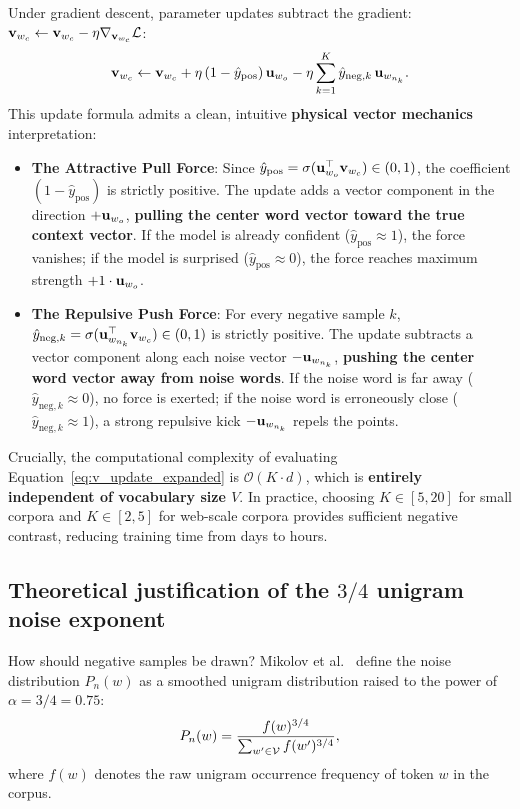 \documentclass[../../main.tex]{subfiles}
\begin{document}
Under gradient descent, parameter updates subtract the gradient: $\mathbf{v}_{w_c} \leftarrow \mathbf{v}_{w_c} - \eta \nabla_{\mathbf{v}_{w_c}} \mathcal{L}$:
\begin{equation}
\label{eq:v_update_expanded}
\mathbf{v}_{w_c} \leftarrow \mathbf{v}_{w_c} + \eta \left( 1 - \hat{y}_{\text{pos}} \right) \mathbf{u}_{w_o} - \eta \sum_{k=1}^K \hat{y}_{\text{neg}, k} \, \mathbf{u}_{w_{n_k}}.
\end{equation}
This update formula admits a clean, intuitive \textbf{physical vector mechanics} interpretation:
\begin{itemize}
    \item \textbf{The Attractive Pull Force}: Since $\hat{y}_{\text{pos}} = \sigma(\mathbf{u}_{w_o}^\top \mathbf{v}_{w_c}) \in (0, 1)$, the coefficient $(1 - \hat{y}_{\text{pos}})$ is strictly positive. The update adds a vector component in the direction $+\mathbf{u}_{w_o}$, \textbf{pulling the center word vector toward the true context vector}. If the model is already confident ($\hat{y}_{\text{pos}} \approx 1$), the force vanishes; if the model is surprised ($\hat{y}_{\text{pos}} \approx 0$), the force reaches maximum strength $+1 \cdot \mathbf{u}_{w_o}$.
    \item \textbf{The Repulsive Push Force}: For every negative sample $k$, $\hat{y}_{\text{neg}, k} = \sigma(\mathbf{u}_{w_{n_k}}^\top \mathbf{v}_{w_c}) \in (0, 1)$ is strictly positive. The update subtracts a vector component along each noise vector $-\mathbf{u}_{w_{n_k}}$, \textbf{pushing the center word vector away from noise words}. If the noise word is far away ($\hat{y}_{\text{neg}, k} \approx 0$), no force is exerted; if the noise word is erroneously close ($\hat{y}_{\text{neg}, k} \approx 1$), a strong repulsive kick $-\mathbf{u}_{w_{n_k}}$ repels the points.
\end{itemize}

Crucially, the computational complexity of evaluating Equation~\eqref{eq:v_update_expanded} is $\mathcal{O}(K \cdot d)$, which is \textbf{entirely independent of vocabulary size $V$}. In practice, choosing $K \in [5, 20]$ for small corpora and $K \in [2, 5]$ for web-scale corpora provides sufficient negative contrast, reducing training time from days to hours.

\subsection{Theoretical justification of the \texorpdfstring{$3/4$}{3/4} unigram noise exponent}
\label{subsec:unigram_three_quarters}

How should negative samples be drawn? Mikolov et al.~\cite{mikolov2013distributed} define the noise distribution $P_n(w)$ as a smoothed unigram distribution raised to the power of $\alpha = 3/4 = 0.75$:
\begin{equation}
\label{eq:unigram_three_quarters}
P_n(w) = \frac{f(w)^{3/4}}{\sum_{w' \in \mathcal{V}} f(w')^{3/4}},
\end{equation}
where $f(w)$ denotes the raw unigram occurrence frequency of token $w$ in the corpus.
\end{document}
